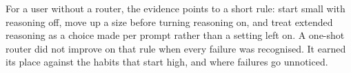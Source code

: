 For a user without a router, the evidence points to a short rule: start
small with reasoning off, move up a size before turning reasoning on, and
treat extended reasoning as a choice made per prompt rather than a setting
left on. A one-shot router did not improve on that rule when every failure
was recognised. It earned its place against the habits that start high, and
where failures go unnoticed.
